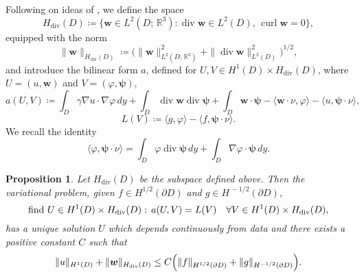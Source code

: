 \documentclass[10pt, a4paper, twoside, openright]{book}
\theoremstyle{definition}
\theoremstyle{plain}
\theoremstyle{plain}
\theoremstyle{plain}
\newtheorem{proposition}[subsection]{Proposition}
\theoremstyle{plain}
\theoremstyle{plain}
\theoremstyle{plain}
\theoremstyle{plain}
\theoremstyle{plain}
\DeclareMathOperator{\divergence}{div}
\DeclareMathOperator{\curl}{curl}
\let\phi\varphi
\begin{document}
Following on ideas of \cite{cakoni-colton-haddar:lsm}, we define the space
\begin{equation}
 H_{\divergence}(D)\coloneqq\bigl\{\bm{w}\in L^2(D;\,\mathbb{R}^3):\divergence\bm{w} \in L^2(D),\, \curl\bm{w}=0 \bigr\},
\end{equation}
equipped with the norm
\begin{equation}
 \|\bm{w}\|_{H_{\divergence}(D)}\coloneqq\bigl(\|\bm{w}\|^2_{L^2(D;\,\mathbb{R}^3)} + \|\divergence\bm{w}\|^2_{L^2(D)}\bigr)^{1/2},
\end{equation}
and introduce the bilinear form $a$, defined for $U,V\in H^1(D)\times H_{\divergence}(D)$, where $U=(u,\bm{w})$ and $V=(\phi,\bm{\psi})$,
\begin{equation}
 a(U,V)\coloneqq \int_D \gamma \nabla u\cdot\nabla \phi\,dy + \int_D\divergence \bm{w}\divergence\bm{\psi} + \int_D\bm{w}\cdot\bm{\psi} - \langle \bm{w}\cdot\nu, \phi \rangle- \langle u,\bm{\psi}\cdot\nu\rangle,
\end{equation}
\begin{equation}
 L(V)\coloneqq \langle g, \phi\rangle - \langle f, \bm{\psi}\cdot\nu\rangle.
\end{equation}
We recall the identity
\begin{equation}
 \label{eq:identity-duality}
 \langle\phi,\bm{\psi}\cdot\nu\rangle = \int_D\phi\divergence\bm\psi\,dy + \int_D\nabla\phi\cdot\bm{\psi}\,dy.
\end{equation}
\begin{proposition}
\label{prop:MITP-variational}
 Let $H_{\divergence}(D)$ be the subspace defined above. Then the variational problem, given $f\in H^{1/2}(\partial D)$ and $g\in H^{\,-1/2}(\partial D)$,
 \begin{equation}
 \label{eq:MITP-variational}
  \textup{find }U\in H^1(D)\times H_{\divergence}(D):\,a(U,V)=L(V) \quad\forall V\in H^1(D)\times H_{\divergence}(D),
 \end{equation}
has a unique solution $U$ 
which depends continuously from data and there exists a positive constant $C$ such that
\begin{equation}
 \|u\|_{H^1(D)} + \|\bm w\|_{H_{\divergence}(D)}\leq C\Bigl(\|f\|_{H^{1/2}(\partial D)}+\|g\|_{H^{-1/2}(\partial D)}\Bigr).
\end{equation}
\end{proposition}
\end{document}
